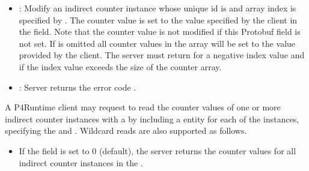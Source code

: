 \documentclass[11pt]{article}
\begin{document}
{\begin{itemize}[noitemsep,topsep=\mdcompacttopsep]
\item{}: Modify an indirect counter instance whose unique id is 
and array index is specified by . The counter value is set to the value
specified by the client in the  field. Note that the counter value is
not modified if this Protobuf field is not set. If  is omitted all
counter values in the array will be set to the value provided by the
client. The server must return  for a negative index value
and  if the index value exceeds the size of the counter array.%

\item{}: Server returns the error code .%
\end{itemize}%

\noindent{}A P4Runtime client may request to read the counter values of one or more
indirect counter instances with a  by including a 
entity for each of the instances, specifying the  and
. Wildcard reads are also supported as follows.%

\begin{itemize}%

\item{}
If the  field is set to 0 (default), the server returns the
counter values for all indirect counter instances in the .%


\end{itemize}}
\end{document}

